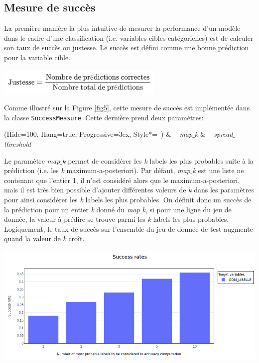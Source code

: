 \subsection{Mesure de succès}

La première manière la plus intuitive de mesurer la performance d’un modèle dans le cadre d’une classification (i.e. variables cibles catégorielles) est de calculer son taux de succès ou justesse. Le succès est défini comme une bonne prédiction pour la variable cible.

\begin{center}
\includegraphics[width=0.6\textwidth]{figures/justesse.png}
\end{center}

Comme illustré sur la Figure \ref{fig5}, cette mesure de succès est implémentée  dans la classe \texttt{SuccessMeasure}. Cette dernière prend deux paramètres:
\begin{easylist}
\ListProperties(Hide=100, Hang=true, Progressive=3ex, Style*=--)
& ~ \textit{map$\_$k}
& ~ \textit{spread$\_$threshold}
\end{easylist}

Le paramètre \textit{map$\_$k} permet de considérer les \textit{k} labels les plus probables suite à la prédiction (i.e. les \textit{k} maximum-a-posteriori). Par défaut, \textit{map$\_$k} est une liste ne contenant que l’entier 1, il n’est considéré alors que le maximum-a-posteriori, mais il est très bien possible d'ajouter différentes valeurs de \textit{k} dans les paramètres pour ainsi considérer les \textit{k} labels les plus probables. On définit donc un succès de la prédiction pour un entier \textit{k} donné du \textit{map$\_$k}, si pour une ligne du jeu de donnée, la valeur à prédire se trouve parmi les \textit{k} labels les plus probables. Logiquement, le taux de succès sur l’ensemble du jeu de donnée de test augmente quand la valeur de \textit{k} croît.

\begin{center}
\includegraphics[width=1\textwidth]{figures/rapport_success_rate.png}
\label{fig10}
\end{center}

